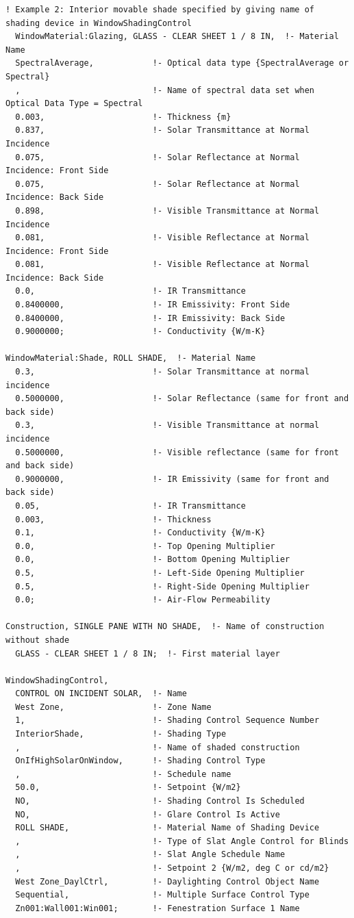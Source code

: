 \begin{lstlisting}
! Example 2: Interior movable shade specified by giving name of shading device in WindowShadingControl
  WindowMaterial:Glazing, GLASS - CLEAR SHEET 1 / 8 IN,  !- Material Name
  SpectralAverage,            !- Optical data type {SpectralAverage or Spectral}
  ,                           !- Name of spectral data set when Optical Data Type = Spectral
  0.003,                      !- Thickness {m}
  0.837,                      !- Solar Transmittance at Normal Incidence
  0.075,                      !- Solar Reflectance at Normal Incidence: Front Side
  0.075,                      !- Solar Reflectance at Normal Incidence: Back Side
  0.898,                      !- Visible Transmittance at Normal Incidence
  0.081,                      !- Visible Reflectance at Normal Incidence: Front Side
  0.081,                      !- Visible Reflectance at Normal Incidence: Back Side
  0.0,                        !- IR Transmittance
  0.8400000,                  !- IR Emissivity: Front Side
  0.8400000,                  !- IR Emissivity: Back Side
  0.9000000;                  !- Conductivity {W/m-K}

WindowMaterial:Shade, ROLL SHADE,  !- Material Name
  0.3,                        !- Solar Transmittance at normal incidence
  0.5000000,                  !- Solar Reflectance (same for front and back side)
  0.3,                        !- Visible Transmittance at normal incidence
  0.5000000,                  !- Visible reflectance (same for front and back side)
  0.9000000,                  !- IR Emissivity (same for front and back side)
  0.05,                       !- IR Transmittance
  0.003,                      !- Thickness
  0.1,                        !- Conductivity {W/m-K}
  0.0,                        !- Top Opening Multiplier
  0.0,                        !- Bottom Opening Multiplier
  0.5,                        !- Left-Side Opening Multiplier
  0.5,                        !- Right-Side Opening Multiplier
  0.0;                        !- Air-Flow Permeability

Construction, SINGLE PANE WITH NO SHADE,  !- Name of construction without shade
  GLASS - CLEAR SHEET 1 / 8 IN;  !- First material layer

WindowShadingControl,
  CONTROL ON INCIDENT SOLAR,  !- Name
  West Zone,                  !- Zone Name
  1,                          !- Shading Control Sequence Number
  InteriorShade,              !- Shading Type
  ,                           !- Name of shaded construction
  OnIfHighSolarOnWindow,      !- Shading Control Type
  ,                           !- Schedule name
  50.0,                       !- Setpoint {W/m2}
  NO,                         !- Shading Control Is Scheduled
  NO,                         !- Glare Control Is Active
  ROLL SHADE,                 !- Material Name of Shading Device
  ,                           !- Type of Slat Angle Control for Blinds
  ,                           !- Slat Angle Schedule Name
  ,                           !- Setpoint 2 {W/m2, deg C or cd/m2}
  West Zone_DaylCtrl,         !- Daylighting Control Object Name
  Sequential,                 !- Multiple Surface Control Type
  Zn001:Wall001:Win001;       !- Fenestration Surface 1 Name


\end{lstlisting}

